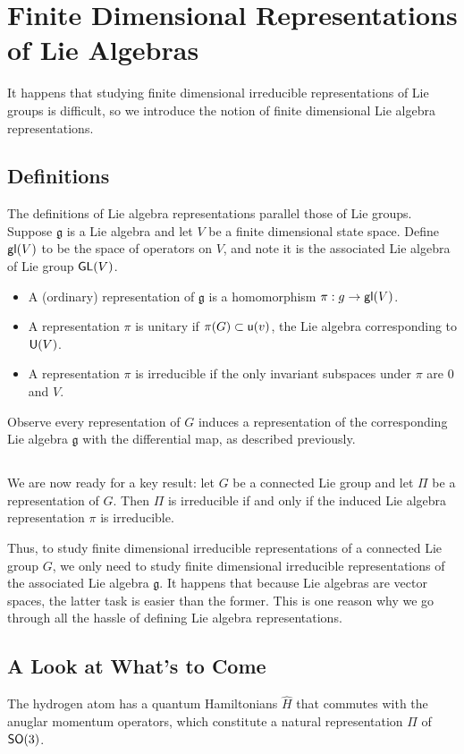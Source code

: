 \section{Finite Dimensional Representations of Lie Algebras}
It happens that studying finite dimensional irreducible representations of Lie groups is difficult, so we introduce the notion of finite dimensional Lie algebra representations.

\subsection{Definitions}
The definitions of Lie algebra representations parallel those of Lie groups. Suppose $\mathfrak g$ is a Lie algebra and let $V$ be a finite dimensional state space. Define $\operatorname{\textsf{gl}}(V)$ to be the space of operators on $V$, and note it is the associated Lie algebra of Lie group $\operatorname{\textsf{GL}}(V)$.
\begin{itemize}
    \item A (ordinary) representation of $\mathfrak g$ is a homomorphism $\mathfrak \pi: g \rightarrow \operatorname{\textsf{gl}}(V)$.
    \item A representation $\pi$ is unitary if $\pi(G) \subset \operatorname{\textsf{u}}(v)$, the Lie algebra corresponding to $\operatorname{\textsf{U}}(V)$.
    \item A representation $\pi$ is irreducible if the only invariant subspaces under $\pi$ are $0$ and $V$.
\end{itemize}
Observe every representation of $G$ induces a representation of the corresponding Lie algebra $\mathfrak g$ with the differential map, as described previously.

\subsection{}
We are now ready for a key result: let $G$ be a connected Lie group and let $\Pi$ be a representation of $G$. Then $\Pi$ is irreducible if and only if the induced Lie algebra representation $\pi$ is irreducible.

Thus, to study finite dimensional irreducible representations of a connected Lie group $G$, we only need to study finite dimensional irreducible representations of the associated Lie algebra $\mathfrak g$. It happens that because Lie algebras are vector spaces, the latter task is easier than the former. This is one reason why we go through all the hassle of defining Lie algebra representations.

\subsection{A Look at What's to Come}
The hydrogen atom has a quantum Hamiltonians $\hat{H}$ that commutes with the anuglar momentum operators, which constitute a natural representation $\Pi$ of $\operatorname{\textsf{SO}}(3)$.

